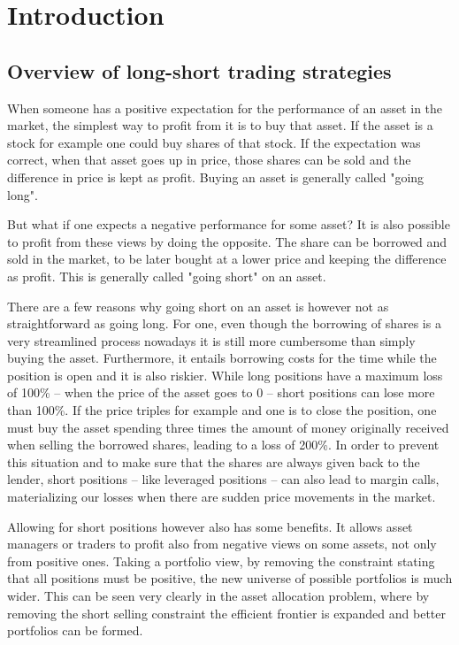 \section{Introduction}
\subsection{Overview of long-short trading strategies}
When someone has a positive expectation for the performance of an asset in the market, the simplest way to profit from it is to buy that asset. If the asset is a stock for example one could buy shares of that stock. If the expectation was correct, when that asset goes up in price, those shares can be sold and the difference in price is kept as profit. Buying an asset is generally called "going long".

But what if one expects a negative performance for some asset? It is also possible to profit from these views by doing the opposite. The share can be borrowed and sold in the market, to be later bought at a lower price and keeping the difference as profit. This is generally called "going short" on an asset.

There are a few reasons why going short on an asset is however not as straightforward as going long. For one, even though the borrowing of shares is a very streamlined process nowadays it is still more cumbersome than simply buying the asset. Furthermore, it entails borrowing costs for the time while the position is open and it is also riskier. While long positions have a maximum loss of 100\% -- when the price of the asset goes to 0 -- short positions can lose more than 100\%. If the price triples for example and one is to close the position, one must buy the asset spending three times the amount of money originally received when selling the borrowed shares, leading to a loss of 200\%. In order to prevent this situation and to make sure that the shares are always given back to the lender, short positions -- like leveraged positions --  can also lead to margin calls, materializing our losses when there are sudden price movements in the market.

Allowing for short positions however also has some benefits. It allows asset managers or traders to profit also from negative views on some assets, not only from positive ones. Taking a portfolio view, by removing the constraint stating that all positions must be positive, the new universe of possible portfolios is much wider. This can be seen very clearly in the asset allocation problem, where by removing the short selling constraint the efficient frontier is expanded and better portfolios can be formed. 

